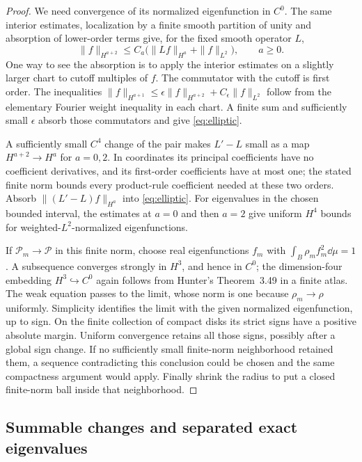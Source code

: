 \begin{proof}
We need convergence of its normalized eigenfunction in \(C^0\).
The same interior estimates, localization by a finite smooth
partition of unity and absorption of lower-order terms give,
for the fixed smooth operator \(L\),
\begin{equation}\label{eq:elliptic}
 \|f\|_{H^{a+2}}\le C_a
       \bigl(\|Lf\|_{H^a}+\|f\|_{L^2}\bigr),\qquad a\ge0.
\end{equation}
One way to see the absorption is to apply the interior estimates
on a slightly larger chart to cutoff multiples of \(f\).
The commutator with the cutoff is first order.
The inequalities
\(\|f\|_{H^{a+1}}\le
 \epsilon\|f\|_{H^{a+2}}+C_\epsilon\|f\|_{L^2}\)
follow from the elementary Fourier weight inequality in each
chart. A finite sum and sufficiently small \(\epsilon\) absorb
those commutators and give \eqref{eq:elliptic}.

A sufficiently small \(C^4\) change of the pair makes
\(L'-L\) small as a map \(H^{a+2}\to H^a\) for \(a=0,2\).
In coordinates its principal coefficients have no coefficient
derivatives, and its first-order coefficients have at most one;
the stated finite norm bounds every product-rule coefficient
needed at these two orders. Absorb
\(\|(L'-L)f\|_{H^a}\) into \eqref{eq:elliptic}.
For eigenvalues in the chosen bounded interval, the estimates
at \(a=0\) and then \(a=2\) give uniform \(H^4\) bounds for
weighted-\(L^2\)-normalized eigenfunctions.

If \(\mathcal P_m\to\mathcal P\) in this finite norm, choose
real eigenfunctions \(f_m\) with
\(\int_B\rho_m f_m^2\dd\mu=1\).
A subsequence converges strongly in \(H^3\), and hence in \(C^0\);
the dimension-four embedding \(H^3\hookrightarrow C^0\)
again follows from Hunter's Theorem~3.49 in a finite atlas.
The weak equation passes to the limit, whose norm is one
because \(\rho_m\to\rho\) uniformly. Simplicity identifies the
limit with the given normalized eigenfunction, up to sign.
On the finite collection of compact disks its strict signs
have a positive absolute margin. Uniform convergence retains
all those signs, possibly after a global sign change.
If no sufficiently small finite-norm neighborhood retained
them, a sequence contradicting this conclusion could be
chosen and the same compactness argument would apply.
Finally shrink the radius to put a closed finite-norm ball
inside that neighborhood.
\end{proof}

\subsection{Summable changes and separated exact eigenvalues}

